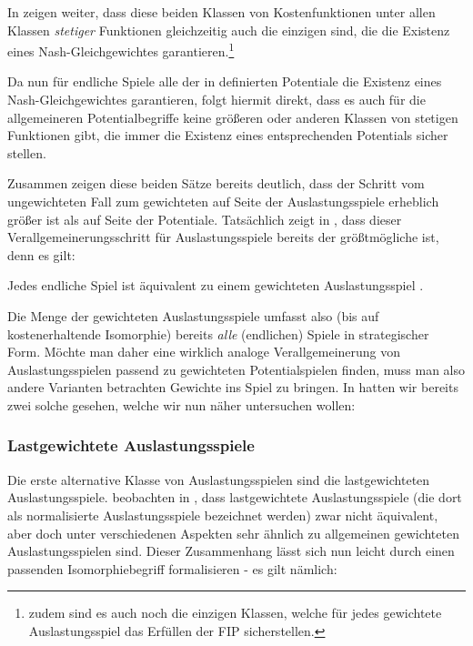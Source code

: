 In \cite[Theorem 5.1]{CharExNGinWCG} zeigen \citeauthor{CharExNGinWCG} weiter, dass diese beiden Klassen von Kostenfunktionen unter allen Klassen \emph{stetiger} Funktionen gleichzeitig auch die einzigen sind, die die Existenz eines Nash-Gleichgewichtes garantieren.\footnote{zudem sind es auch noch die einzigen Klassen, welche für jedes gewichtete Auslastungsspiel das Erfüllen der FIP sicherstellen.}

Da nun für endliche Spiele alle der in  definierten Potentiale die Existenz eines Nash-Gleichgewichtes garantieren, folgt hiermit direkt, dass es auch für die allgemeineren Potentialbegriffe keine größeren oder anderen Klassen von stetigen Funktionen gibt, die immer die Existenz eines entsprechenden Potentials sicher stellen.

Zusammen zeigen diese beiden Sätze bereits deutlich, dass der Schritt vom ungewichteten Fall zum gewichteten auf Seite der Auslastungsspiele erheblich größer ist als auf Seite der Potentiale. Tatsächlich zeigt \citeauthor{ReprOfFiniteGamesAsNCG} in \cite{ReprOfFiniteGamesAsNCG}, dass dieser Verallgemeinerungsschritt für Auslastungsspiele bereits der größtmögliche ist, denn es gilt:

\begin{satz}\label{satz:JedesSpielGewAusl}
	Jedes endliche Spiel ist äquivalent zu einem gewichteten Auslastungsspiel .
\end{satz}

Die Menge der gewichteten Auslastungsspiele umfasst also (bis auf kostenerhaltende Isomorphie) bereits \emph{alle} (endlichen) Spiele in strategischer Form. Möchte man daher eine wirklich analoge Verallgemeinerung von Auslastungsspielen passend zu gewichteten Potentialspielen finden, muss man also andere Varianten betrachten Gewichte ins Spiel zu bringen. In  hatten wir bereits zwei solche gesehen, welche wir nun näher untersuchen wollen:

\subsubsection{Lastgewichtete Auslastungsspiele}

Die erste alternative Klasse von Auslastungsspielen sind die lastgewichteten Auslastungsspiele. \citeauthor{CharExGewPotinWCG} beobachten in \cite{CharExGewPotinWCG}, dass lastgewichtete Auslastungsspiele (die dort als normalisierte Auslastungsspiele bezeichnet werden) zwar nicht äquivalent, aber doch unter verschiedenen Aspekten sehr ähnlich zu allgemeinen gewichteten Auslastungsspielen sind. Dieser Zusammenhang lässt sich nun leicht durch einen passenden Isomorphiebegriff formalisieren - es gilt nämlich:


